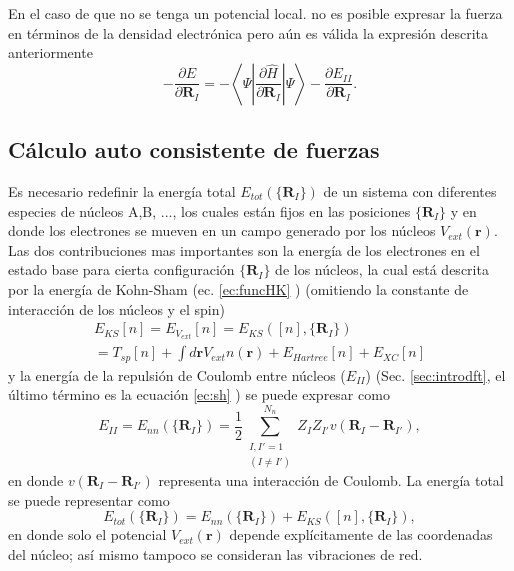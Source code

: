    En el caso de que no se tenga un potencial local. no es posible expresar la fuerza en t\'erminos de la densidad electr\'onica pero a\'un es v\'alida la expresi\'on descrita anteriormente \cite{Martin-2004}
   \begin{equation}
   -\frac{\partial E}{\partial \pmb{R}_I} = - \left\langle \Psi \left| \frac{\partial \hat{H}}{\partial \pmb{R}_I} \right| \Psi \right\rangle - \frac{\partial E_{II}}{\partial \pmb{R}_I}. \label{ec:HFT}
   \end{equation}
   \subsection{C\'alculo auto consistente de fuerzas} \label{subsec:SConsFuerza}
   Es necesario redefinir la energ\'ia total $E_{tot} (\{\pmb{R}_I\})$ de un sistema con diferentes especies de n\'ucleos A,B, ..., los cuales est\'an fijos en las posiciones $\{\pmb{R}_I\} $ y en donde los electrones se mueven en un campo generado por los n\'ucleos $V_{ext} (\pmb{r})$. Las dos contribuciones mas importantes son la energ\'ia de los electrones en el estado base para cierta configuraci\'on $\{\pmb{R}_I\}$ de los n\'ucleos, la cual est\'a descrita por la energ\'ia de Kohn-Sham (ec. \ref{ec:funcHK} )  (omitiendo la constante de interacci\'on de los n\'ucleos y el spin) 
   \begin{multline}
   E_{KS} [n] = E_{V_{ext}} [n] = E_{KS} ([n],\{\pmb{R}_I\}) \\
   = T_{sp} [n] + \int d \pmb{r} V_{ext} n(\pmb{r}) + E_{Hartree} [n] + E_{XC} [n] \label{ec:KS_Fuerza}
   \end{multline}
   y la energ\'ia de la repulsi\'on de Coulomb  entre n\'ucleos ($E_{I I}$) (Sec. \ref{sec:introdft}, el \'ultimo t\'ermino es la ecuaci\'on \ref{ec:sh} ) se puede expresar como
   \begin{equation}
   	E_{II} = E_{nn} (\{\pmb{R}_I\}) = \frac{1}{2} \sum_{\substack{I,I' = 1 \\ (I \not = I')}}^ {N_n} Z_I Z_{I'} v(\pmb{R}_I - \pmb{R}_{I'}), \label{ec:IntII}
   \end{equation}
   en donde $ v(\pmb{R}_I - \pmb{R}_{I'})$ representa una interacci\'on de Coulomb. La energ\'ia total se puede representar como
   \begin{equation}
   E_{tot} (\{\pmb{R}_I\}) = E_{nn} (\{\pmb{R}_I\}) + E_{KS} ([n], \{\pmb{R}_I\}), \label{ec:EnTot2} 
   \end{equation}
   en donde  solo el potencial $V_{ext} (\pmb{r})$ depende expl\'icitamente de las coordenadas del n\'ucleo; as\'i mismo tampoco se consideran las vibraciones de red.
